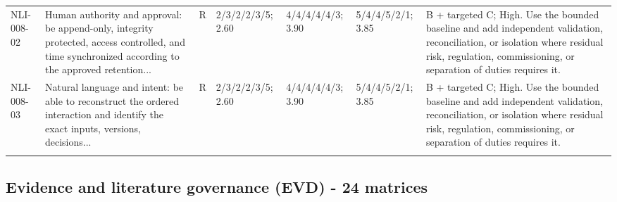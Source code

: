 \documentclass[11pt,letterpaper]{article}
\begin{document}
\begin{scriptsize}
\begin{longtable}{@{}L{0.11\textwidth}L{0.165\textwidth}L{0.04\textwidth}L{0.115\textwidth}L{0.115\textwidth}L{0.115\textwidth}L{0.235\textwidth}@{}}
\addlinespace[2pt]
NLI-008-02 & Human authority and approval: be append-only, integrity protected, access controlled, and time synchronized according to the approved retention... & R & 2/3/2/2/3/5; 2.60 & 4/4/4/4/4/3; 3.90 & 5/4/4/5/2/1; 3.85 & B + targeted C; High. Use the bounded baseline and add independent validation, reconciliation, or isolation where residual risk, regulation, commissioning, or separation of duties requires it. \\
\addlinespace[2pt]
NLI-008-03 & Natural language and intent: be able to reconstruct the ordered interaction and identify the exact inputs, versions, decisions... & R & 2/3/2/2/3/5; 2.60 & 4/4/4/4/4/3; 3.90 & 5/4/4/5/2/1; 3.85 & B + targeted C; High. Use the bounded baseline and add independent validation, reconciliation, or isolation where residual risk, regulation, commissioning, or separation of duties requires it. \\
\addlinespace[2pt]
\end{longtable}
\end{scriptsize}

\subsection{Evidence and literature governance (EVD) - 24 matrices}
\end{document}
